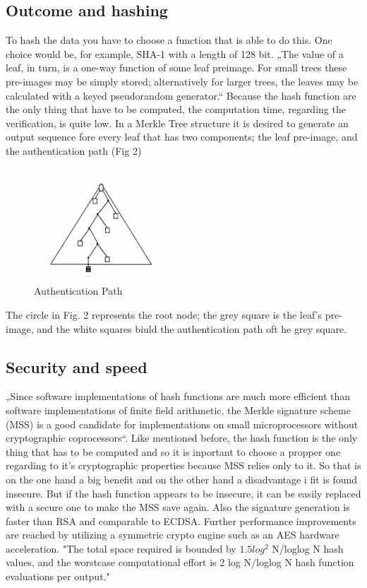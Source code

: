 \subsection{Outcome and hashing}
To hash the data you have to choose a function that is able to do this. One choice would be, for example, SHA-1 with a length of 128 bit.
„The value of a leaf, in turn, is a one-way function of some leaf preimage. For small trees these pre-images may be simply stored; alternatively for larger trees, the leaves may be calculated with a keyed pseudorandom generator.“ \cite{MT} Because the hash function are the only thing that have to be computed, the computation time, regarding the verification, is quite low. \cite{METR} In a Merkle Tree structure it is desired to generate an output sequence fore every leaf that has two components; the leaf pre-image, and the authentication path (Fig 2) \cite{MT}

\begin{figure}
\centering
\includegraphics[width=5cm]{Pages/Merkle/API.png}
\caption{Authentication Path}
\end{figure}

The circle in Fig. 2 represents the root node; the grey square is the leaf’s pre-image, and the white squares biuld the authentication path oft he grey square.

\subsection{Security and speed}
„Since software implementations of hash functions are much more efficient than software implementations of finite field arithmetic, the Merkle signature scheme (MSS) is a good candidate for implementations on small microprocessors without cryptographic coprocessors“. \cite{FHB} Like mentioned before, the hash function is the only thing that has to be computed and so it is inportant to choose a propper one regarding to it’s cryptographic properties because MSS relies only to it. So that is on the one hand a big benefit and on the other hand a disadvantage i fit is found insecure. But if the hash function appears to be insecure, it can be easily replaced with a secure one to make the MSS save again. Also the signature generation is faster than RSA and comparable to ECDSA. Further performance improvements are reached by utilizing a symmetric crypto engine such as an AES hardware acceleration. \cite{FHB}  "The total space
required is bounded by $ 1.5 log^2 $  N/loglog N hash values, and the worstcase computational effort is 2 log N/loglog N hash function evaluations
per output." \cite{MT}